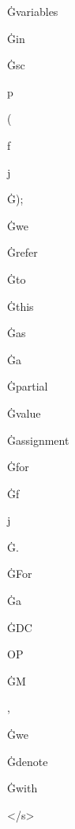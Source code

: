 \documentclass[varwidth]{standalone}
\begin{document}
\begin{CJK*}{UTF8}{gbsn}
{{{\colorbox{red!0.12111691}{\strut Ġvariables} \colorbox{red!0.13934861}{\strut Ġin} \colorbox{red!0.113157354}{\strut Ġsc} \colorbox{red!0.022567948}{\strut p} \colorbox{red!0.10620329}{\strut (} \colorbox{red!0.0}{\strut f} \colorbox{red!0.008865614}{\strut j} \colorbox{red!0.30703798}{\strut Ġ);} \colorbox{red!0.15301235}{\strut Ġwe} \colorbox{red!0.1947504}{\strut Ġrefer} \colorbox{red!0.020415466}{\strut Ġto} \colorbox{red!0.093146734}{\strut Ġthis} \colorbox{red!0.075294435}{\strut Ġas} \colorbox{red!0.097458445}{\strut Ġa} \colorbox{red!0.13176586}{\strut Ġpartial} \colorbox{red!0.05631387}{\strut Ġvalue} \colorbox{red!0.12181604}{\strut Ġassignment} \colorbox{red!0.06437733}{\strut Ġfor} \colorbox{red!0.034375258}{\strut Ġf} \colorbox{red!0.035163976}{\strut j} \colorbox{red!0.10053149}{\strut Ġ.} \colorbox{red!0.08541494}{\strut ĠFor} \colorbox{red!0.13185933}{\strut Ġa} \colorbox{red!0.03655857}{\strut ĠDC} \colorbox{red!0.020846384}{\strut OP} \colorbox{red!0.103981026}{\strut ĠM} \colorbox{red!0.100345574}{\strut ,} \colorbox{red!0.07498117}{\strut Ġwe} \colorbox{red!0.2264219}{\strut Ġdenote} \colorbox{red!0.1122982}{\strut Ġwith} \colorbox{red!0.10678834}{\strut </s>} 
}}}
\end{CJK*}
\end{document}
